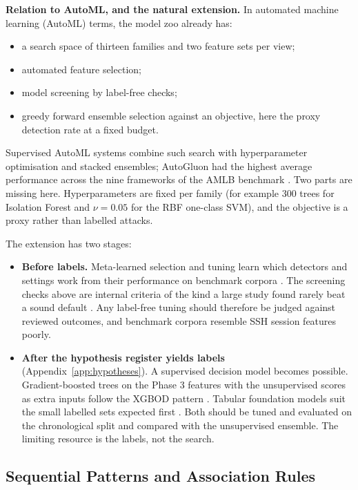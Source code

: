 \documentclass[11pt,a4paper]{article}
\begin{document}
\textbf{Relation to AutoML, and the natural extension.} In automated machine learning (AutoML) terms, the model zoo already has:
\begin{itemize}
\item a search space of thirteen families and two feature sets per view;
\item automated feature selection;
\item model screening by label-free checks;
\item greedy forward ensemble selection against an objective, here the proxy detection rate at a fixed budget.
\end{itemize}
Supervised AutoML systems combine such search with hyperparameter optimisation and stacked ensembles; AutoGluon had the highest average performance across the nine frameworks of the AMLB benchmark \cite{ref14}. Two parts are missing here. Hyperparameters are fixed per family (for example 300 trees for Isolation Forest and \(\nu=0.05\) for the RBF one-class SVM), and the objective is a proxy rather than labelled attacks.

The extension has two stages:
\begin{itemize}
\item \textbf{Before labels.} Meta-learned selection and tuning learn which detectors and settings work from their performance on benchmark corpora \cite{ref15,ref19}. The screening checks above are internal criteria of the kind a large study found rarely beat a sound default \cite{ref16}. Any label-free tuning should therefore be judged against reviewed outcomes, and benchmark corpora resemble SSH session features poorly.
\item \textbf{After the hypothesis register yields labels} (Appendix~\ref{app:hypotheses}). A supervised decision model becomes possible. Gradient-boosted trees on the Phase 3 features with the unsupervised scores as extra inputs follow the XGBOD pattern \cite{ref17}. Tabular foundation models suit the small labelled sets expected first \cite{ref18}. Both should be tuned and evaluated on the chronological split and compared with the unsupervised ensemble. The limiting resource is the labels, not the search.
\end{itemize}

\subsection{Sequential Patterns and Association Rules}\label{sec:seqmethods}
\end{document}
